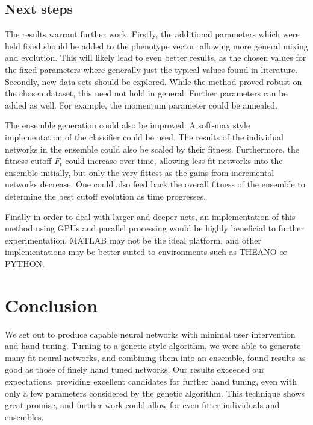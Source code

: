 \documentclass{article}
\DeclareMathOperator{\1}{\mathbbm{1}}
\begin{document}
\subsection{Next steps}
The results warrant further work. Firstly, the additional parameters which were held fixed should be added to the phenotype vector, allowing 
more general mixing and evolution. This will likely lead to even better results, as the chosen values for the fixed parameters where 
generally just the typical values found in literature. Secondly, new data sets should be explored. While the method proved robust on the 
chosen dataset, this need not hold in general. Further parameters can be added as well. For example, the momentum parameter could be annealed. 

The ensemble generation could also be improved. A soft-max style implementation of the classifier could be used. The results of the individual
networks in the ensemble could also be scaled by their fitness. Furthermore, the fitness cutoff $F_t$ could increase over time, allowing less
fit networks into the ensemble initially, but only the very fittest as the gains from incremental networks decrease. One could also feed back 
the overall fitness of the ensemble to determine the best cutoff evolution as time progresses. 

Finally in order to deal with larger and deeper nets, an implementation of this method using GPUs and parallel processing would be highly 
beneficial to further experimentation. MATLAB may not be the ideal platform, and other implementations may be better suited to environments 
such as THEANO or PYTHON.


\section{Conclusion}
We set out to produce capable neural networks with minimal user intervention and hand tuning. Turning to a genetic style algorithm, we
were able to generate many fit neural networks, and combining them into an ensemble, found results as good as those of finely hand tuned
networks. Our results exceeded our expectations, providing excellent candidates for further hand tuning, even with only a few parameters 
considered by the genetic algorithm. This technique shows great promise, and further work could allow for even fitter individuals and 
ensembles.
\end{document}
